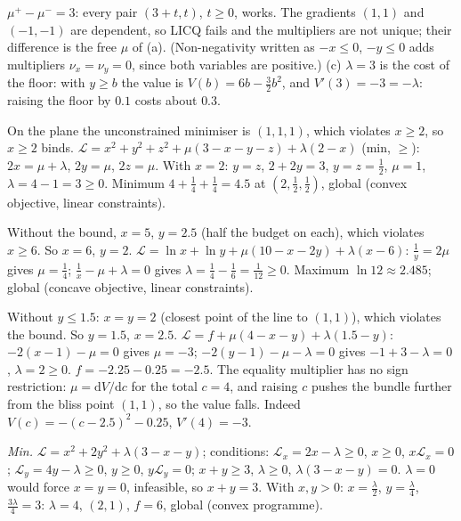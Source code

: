 \begin{solutions}
        $\mu^{+}-\mu^{-}=3$: every pair $(3+t,t)$, $t\ge0$, works. The
        gradients $(1,1)$ and $(-1,-1)$ are dependent, so LICQ fails and the
        multipliers are not unique; their difference is the free $\mu$ of
        (a). (Non-negativity written as $-x\le0$, $-y\le0$ adds multipliers
        $\nu_x=\nu_y=0$, since both variables are positive.)
        (c) $\lambda=3$ is the cost of the floor: with $y\ge b$ the value is
        $V(b)=6b-\tfrac32b^{2}$, and $V'(3)=-3=-\lambda$: raising the floor by
        $0.1$ costs about $0.3$.
  \item On the plane the unconstrained minimiser is $(1,1,1)$, which
        violates $x\ge2$, so $x\ge2$ binds. $\mathcal{L}=x^{2}+y^{2}+z^{2}
        +\mu(3-x-y-z)+\lambda(2-x)$ (min, $\ge$): $2x=\mu+\lambda$,
        $2y=\mu$, $2z=\mu$. With $x=2$: $y=z$, $2+2y=3$, $y=z=\tfrac12$,
        $\mu=1$, $\lambda=4-1=3\ge0$. Minimum $4+\tfrac14+\tfrac14=4.5$ at
        $(2,\tfrac12,\tfrac12)$, global (convex objective, linear
        constraints).
  \item Without the bound, $x=5$, $y=2.5$ (half the budget on each), which
        violates $x\ge6$. So $x=6$, $y=2$. $\mathcal{L}=\ln x+\ln y
        +\mu(10-x-2y)+\lambda(x-6)$: $\tfrac1y=2\mu$ gives $\mu=\tfrac14$;
        $\tfrac1x-\mu+\lambda=0$ gives $\lambda=\tfrac14-\tfrac16=\tfrac1{12}\ge0$.
        Maximum $\ln12\approx2.485$; global (concave objective, linear
        constraints).
  \item Without $y\le1.5$: $x=y=2$ (closest point of the line to $(1,1)$),
        which violates the bound. So $y=1.5$, $x=2.5$.
        $\mathcal{L}=f+\mu(4-x-y)+\lambda(1.5-y)$: $-2(x-1)-\mu=0$ gives
        $\mu=-3$; $-2(y-1)-\mu-\lambda=0$ gives $-1+3-\lambda=0$, $\lambda=2\ge0$.
        $f=-2.25-0.25=-2.5$. The equality multiplier has no sign
        restriction: $\mu=\mathrm{d}V/\mathrm{d}c$ for the total $c=4$, and
        raising $c$ pushes the bundle further from the bliss point $(1,1)$,
        so the value falls. Indeed $V(c)=-(c-2.5)^{2}-0.25$, $V'(4)=-3$.
  \item \emph{Min.} $\mathcal{L}=x^{2}+2y^{2}+\lambda(3-x-y)$; conditions:
        $\mathcal{L}_x=2x-\lambda\ge0$, $x\ge0$, $x\mathcal{L}_x=0$;
        $\mathcal{L}_y=4y-\lambda\ge0$, $y\ge0$, $y\mathcal{L}_y=0$;
        $x+y\ge3$, $\lambda\ge0$, $\lambda(3-x-y)=0$. $\lambda=0$ would force
        $x=y=0$, infeasible, so $x+y=3$. With $x,y>0$: $x=\tfrac\lambda2$,
        $y=\tfrac\lambda4$, $\tfrac{3\lambda}4=3$: $\lambda=4$, $(2,1)$,
        $f=6$, global (convex programme).

\end{solutions}
